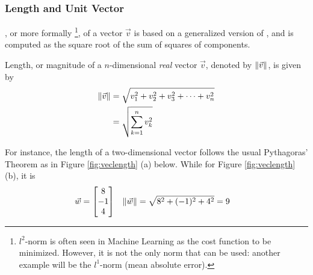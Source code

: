 \subsubsection{Length and Unit Vector} , or more formally \footnote{$l^2$-norm is often seen in Machine Learning as the cost function to be minimized. However, it is not the only norm that can be used: another example will be the $l^1$-norm (mean absolute error).}, of a vector $\vec{v}$ is based on a generalized version of , and is computed as the square root of the sum of squares of components.
\begin{defn}
\label{defn:vectorlength}
Length, or magnitude of a $n$-dimensional \textit{real} vector $\vec{v}$, denoted by $\norm{\vec{v}}$, is given by
\begin{subequations}
\label{eqn:veclength}
\begin{align}
\norm{\vec{v}} &= \sqrt{v_1^2 + v_2^2 + v_3^2 + \cdots + v_n^2} \\
&= \sqrt{\sum_{k=1}^{n} v_k^2}
\end{align}    
\end{subequations}
\end{defn}
For instance, the length of a two-dimensional vector follows the usual Pythagoras' Theorem as in Figure \ref{fig:veclength} (a) below. While for Figure \ref{fig:veclength} (b), it is
\begin{align*}
\vec{w} &= 
\begin{bmatrix}
8 \\
-1 \\
4
\end{bmatrix}
& \norm{\vec{w}}&=
\sqrt{8^2 + (-1)^2 + 4^2} = 9 
\end{align*}

